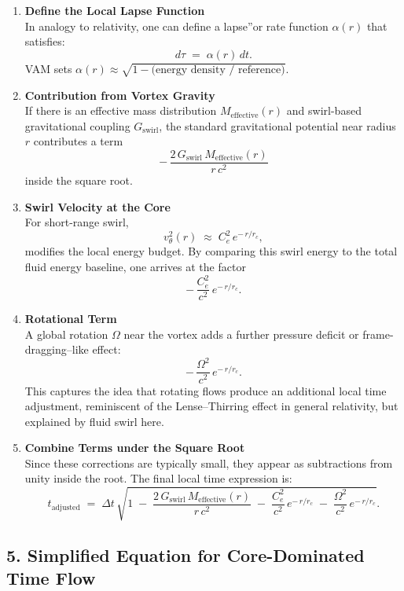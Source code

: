 \begin{enumerate}
    \item \textbf{Define the Local Lapse Function} \\
    In analogy to relativity, one can define a \grqq lapse\textquotedblright or rate function \(\alpha(r)\) that satisfies:
    \[
        d\tau
        \;=\;
        \alpha(r)\,dt.
    \]
    VAM sets \(\alpha(r)\approx \sqrt{1 - \text{(energy density / reference)}}\).
    \item \textbf{Contribution from Vortex Gravity} \\
    If there is an effective mass distribution \(M_\text{effective}(r)\) and swirl-based gravitational coupling \(G_\text{swirl}\), the standard gravitational potential near radius \(r\) contributes a term
    \[
        -\,\frac{2\,G_\text{swirl}\,M_\text{effective}(r)}{r\,c^2}
    \]
    inside the square root.
    \item \textbf{Swirl Velocity at the Core} \\
    For short-range swirl,
    \[
        v_{\theta}^2(r)
        \;\approx\;
        C_e^2\, e^{-\,r/r_c},
    \]
    modifies the local energy budget. By comparing this swirl energy to the total fluid energy baseline, one arrives at the factor
    \[
        -\,\frac{C_e^2}{c^2}\, e^{-\,r/r_c}.
    \]
    \item \textbf{Rotational Term} \\
    A global rotation \(\Omega\) near the vortex adds a further pressure deficit or frame-dragging–like effect:
    \[
        -\,\frac{\Omega^2}{c^2}\, e^{-\,r/r_c}.
    \]
    This captures the idea that rotating flows produce an additional local time adjustment, reminiscent of the Lense–Thirring effect in general relativity, but explained by fluid swirl here.
    \item \textbf{Combine Terms under the Square Root} \\
    Since these corrections are typically small, they appear as subtractions from unity inside the root. The final local time expression is:
    \[
        t_\text{adjusted}
        \;=\;
        \Delta t \,\sqrt{
            1
            \;-\;
            \frac{2\,G_\text{swirl}\,M_\text{effective}(r)}{r\,c^2}
            \;-\;
            \frac{C_e^2}{c^2}\, e^{-\,r/r_c}
            \;-\;
            \frac{\Omega^2}{c^2}\, e^{-\,r/r_c}
        }.
    \]
\end{enumerate}

\subsection*{5. Simplified Equation for Core-Dominated Time Flow}


